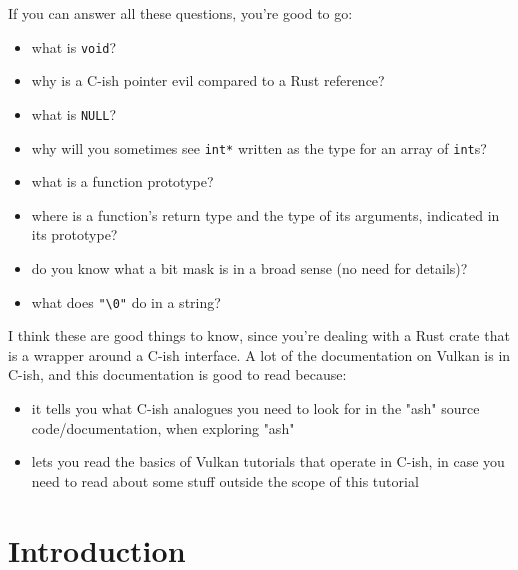 \documentclass[12pt,letterpaper]{article}
\newcommand{\cil}[1]{\texttt{#1}}
\begin{document}
	If you can answer all these questions, you're good to go:
		\begin{itemize}
			\item what is \cil{void}? 
			\item why is a C-ish pointer evil compared to a Rust reference?
			\item what is \cil{NULL}?
			\item why will you sometimes see \cil{int*} written as the type for an array of \cil{int}s?
			\item what is a function prototype? 
			\item where is a function's return type and the type of its arguments, indicated in its prototype?
			\item do you know what a bit mask is in a broad sense (no need for details)?
			\item what does \texttt{"\textbackslash0"} do in a string?
		\end{itemize}
	
	I think these are good things to know, since you're dealing with a Rust crate that is a wrapper around a C-ish interface. A lot of the documentation on Vulkan is in C-ish, and this documentation is good to read because:
		\begin{itemize}
			\item it tells you what C-ish analogues you need to look for in the "ash" source code/documentation, when exploring "ash"
			
			\item lets you read the basics of Vulkan tutorials that operate in C-ish, in case you need to read about some stuff outside the scope of this tutorial
		\end{itemize}
	
\section{Introduction}
\end{document}
